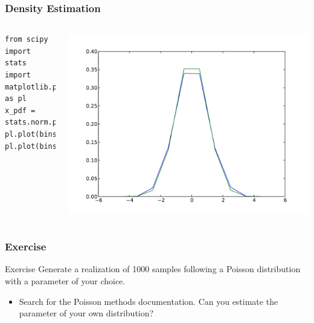 \documentclass[10pt,colorlinks]{beamer}
\begin{document}
%
\begin{frame}[fragile]\frametitle{Density Estimation}


\begin{columns}[c]
\begin{verbatim}
from scipy import stats
import matplotlib.pyplot as pl
x_pdf = stats.norm.pdf(bins)
pl.plot(bins,hist)
pl.plot(bins,x_pdf)
\end{verbatim}

\includegraphics[width=\textwidth]{plwfigis/CursP_3_figure12}

\end{columns}
\end{frame}

\begin{frame}\frametitle{Exercise}
  \begin{block}{Exercise}
  Generate a realization of 1000 samples following a Poisson distribution with a parameter of your choice.
 \begin{itemize}
     \item Search for the Poisson methods documentation. Can you estimate the parameter of your own distribution?
 \end{itemize}
  \end{block}
\end{frame}
\end{document}
